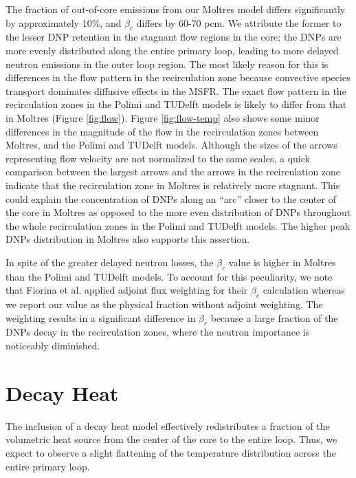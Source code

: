 The fraction of out-of-core emissions from our Moltres model
differs significantly by approximately 10\%, and $\beta_c$ differs by
60-70 pcm. We attribute the former to the lesser \gls{DNP} retention in the
stagnant flow regions in the core; the \glspl{DNP} are more evenly distributed
along the entire primary loop, leading to more delayed neutron emissions in
the outer loop region. The most likely reason for this is differences in the
flow pattern in the recirculation zone because convective species transport
dominates diffusive effects in the \gls{MSFR}. The exact flow pattern in the
recirculation zones in the Polimi and TUDelft models is likely to differ from
that in Moltres (Figure \ref{fig:flow}). Figure \ref{fig:flow-temp} also shows
some minor differences in the magnitude of the flow in the recirculation zones
between Moltres, and the Polimi and TUDelft models. Although the sizes of the
arrows representing flow velocity are not normalized to the same scales, a
quick comparison between the largest arrows and the arrows in the
recirculation zone indicate that the recirculation zone in Moltres is
relatively more stagnant. This could explain the concentration of \glspl{DNP}
along an ``arc'' closer to the center of the core in Moltres as opposed to the
more even distribution of \glspl{DNP} throughout the whole recirculation zones
in the Polimi and TUDelft models. The higher peak \glspl{DNP} distribution in
Moltres also supports this assertion.

In spite of the greater delayed neutron losses, the $\beta_c$ value is higher
in Moltres than the Polimi and TUDelft models. To account for this
peculiarity, we note that Fiorina et al. \cite{fiorina_modelling_2014}
applied adjoint flux weighting for their $\beta_c$ calculation whereas we
report our value as the physical fraction without adjoint weighting. The
weighting results in a significant difference in $\beta_c$ because a large
fraction of the \glspl{DNP} decay in the recirculation zones, where the
neutron importance is noticeably diminished.

\section{Decay Heat}

The inclusion of a decay heat model effectively redistributes a fraction of
the volumetric heat source from the center of the core to the entire loop.
Thus, we expect to observe a slight flattening of the temperature distribution
across the entire primary loop.

